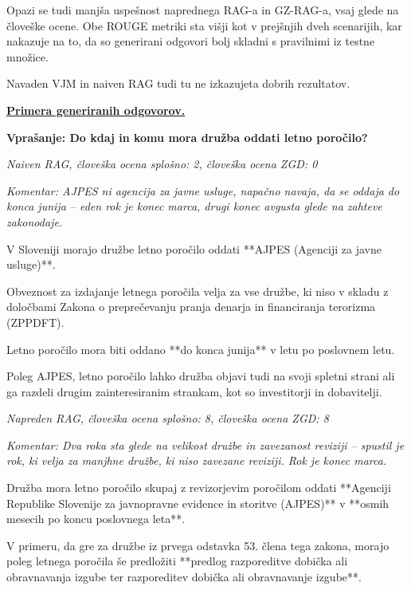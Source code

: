 \documentclass[a4paper,12pt,openright]{book}
\begin{document}
Opazi se tudi manjša uspešnost naprednega RAG-a in GZ-RAG-a, vsaj glede na človeške ocene. Obe ROUGE metriki sta višji kot v prejšnjih dveh scenarijih, kar nakazuje na to, da so generirani odgovori bolj skladni s pravilnimi iz testne množice.

Navaden VJM in naiven RAG tudi tu ne izkazujeta dobrih rezultatov.

\underline{\textbf{Primera generiranih odgovorov.}}

\textbf{Vprašanje: Do kdaj in komu mora družba oddati letno poročilo?}

\textit{Naiven RAG, človeška ocena splošno: 2, človeška ocena ZGD: 0}

\textit{Komentar: AJPES ni agencija za javne usluge, napačno navaja, da se oddaja do konca junija – eden rok je konec marca, drugi konec avgusta glede na zahteve zakonodaje.}

\begin{mdframed}[linewidth=1pt]
    \raggedright
    \ttfamily
    V Sloveniji morajo družbe letno poročilo oddati **AJPES (Agenciji za javne usluge)**.

Obveznost za izdajanje letnega poročila velja za vse družbe, ki niso v skladu z določbami Zakona o preprečevanju pranja denarja in financiranja terorizma (ZPPDFT).

Letno poročilo mora biti oddano **do konca junija** v letu po poslovnem letu.

Poleg AJPES, letno poročilo lahko družba objavi tudi na svoji spletni strani ali ga razdeli drugim zainteresiranim strankam, kot so investitorji in dobavitelji.
\end{mdframed}

\textit{Napreden RAG, človeška ocena splošno: 8, človeška ocena ZGD: 8}

\textit{Komentar: Dva roka sta glede na velikost družbe in zavezanost reviziji – spustil je rok, ki velja za manjhne družbe, ki niso zavezane reviziji. Rok je konec marca.}

\begin{mdframed}[linewidth=1pt]
    \raggedright
    \ttfamily
Družba mora letno poročilo skupaj z revizorjevim poročilom oddati **Agenciji Republike Slovenije za javnopravne evidence in storitve (AJPES)** v **osmih mesecih po koncu poslovnega leta**.


V primeru, da gre za družbe iz prvega odstavka 53. člena tega zakona, morajo poleg letnega poročila še predložiti **predlog razporeditve dobička ali obravnavanja izgube ter razporeditev dobička ali obravnavanje izgube**.
\end{mdframed}
\end{document}
